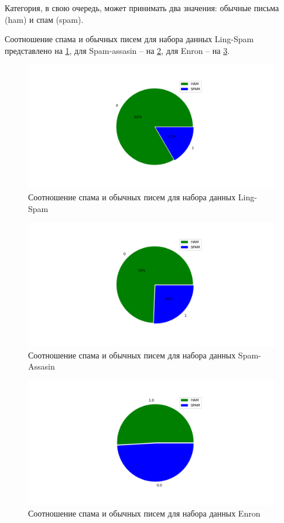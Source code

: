 Категория, в свою очередь, может принимать два значения: обычные письма (ham) и спам (spam).

Соотношение спама и обычных писем для набора данных Ling-Spam представлено на \ref{LingSpamScheme},
для Spam-assasin -- на \ref{SpamAssasinScheme}, для Enron -- на \ref{EnronScheme}.

\begin{figure}[H]
    \centering
    \includegraphics[width=150mm]{static/ling_spam.png}
    \caption{Соотношение спама и обычных писем для набора данных Ling-Spam}
    \label{LingSpamScheme}
\end{figure}

\begin{figure}[H]
    \centering
    \includegraphics[width=150mm]{static/spam_assasin.png}
    \caption{Соотношение спама и обычных писем для набора данных Spam-Assasin}
    \label{SpamAssasinScheme}
\end{figure}

\begin{figure}[H]
    \centering
    \includegraphics[width=150mm]{static/enron.png}
    \caption{Соотношение спама и обычных писем для набора данных Enron}
    \label{EnronScheme}
\end{figure}


